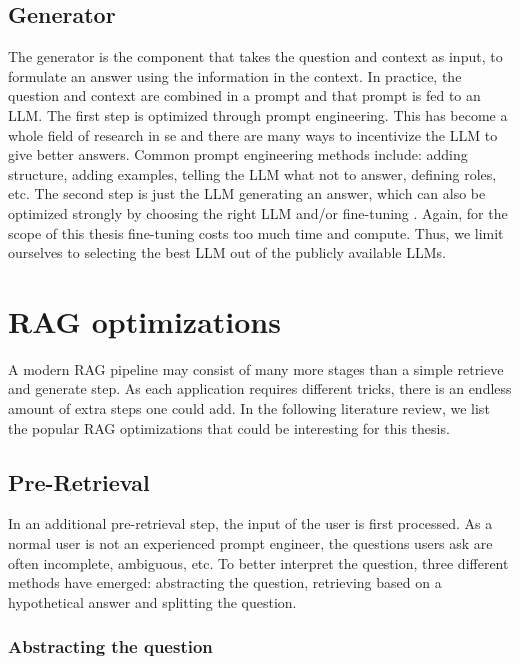 \subsection{Generator}
The generator is the component that takes the question and context as input, to formulate an answer using the information in the context. In practice, the question and context are combined in a prompt and that prompt is fed to an LLM. The first step is optimized through prompt engineering. This has become a whole field of research in se and there are many ways to incentivize the LLM to give better answers. Common prompt engineering methods include: adding structure, adding examples, telling the LLM what not to answer, defining roles, etc. \cite{brown2020language, chen2023unleashing, white2023prompt} The second step is just the LLM generating an answer, which can also be optimized strongly by choosing the right LLM and/or fine-tuning \cite{han2024parameter, xu2023parameter}. Again, for the scope of this thesis fine-tuning costs too much time and compute. Thus, we limit ourselves to selecting the best LLM out of the publicly available LLMs.

\section{RAG optimizations}
A modern RAG pipeline may consist of many more stages than a simple retrieve and generate step. As each application requires different tricks, there is an endless amount of extra steps one could add. In the following literature review, we list the popular RAG optimizations that could be interesting for this thesis.

\subsection{Pre-Retrieval}
\label{sec:pre_retrieval}
In an additional pre-retrieval step, the input of the user is first processed. As a normal user is not an experienced prompt engineer, the questions users ask are often incomplete, ambiguous, etc. To better interpret the question, three different methods have emerged: abstracting the question, retrieving based on a hypothetical answer and splitting the question.

\subsubsection{Abstracting the question}

